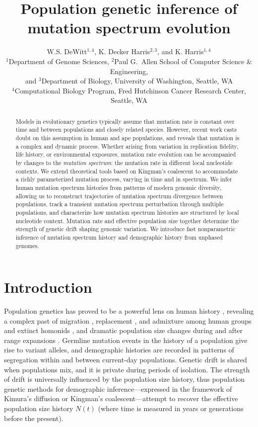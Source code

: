 \documentclass[11pt]{article}
\title{Population genetic inference of mutation spectrum evolution}
\author{
W.S. DeWitt$^{1,4}$, K. Decker Harris$^{2,3}$, and K. Harris$^{1,4}$\\
{\small
$^1$Department of Genome Sciences,
$^2$Paul G.\ Allen School of Computer Science \& Engineering,}\\
{\small and $^3$Department of Biology, University of Washington, Seattle, WA}\\
{\small $^4$Computational Biology Program, Fred Hutchinson Cancer Research Center, Seattle, WA}
}
\begin{document}
\maketitle

\begin{abstract}

Models in evolutionary genetics typically assume that mutation rate is constant over time and between populations and closely related species.
However, recent work casts doubt on this assumption in human and ape populations, and reveals that mutation is a complex and dynamic process.
Whether arising from variation in replication fidelity, life history, or environmental exposures, mutation rate evolution can be accompanied by changes to the \emph{mutation spectrum}: the mutation rate in different local nucleotide contexts.
We extend theoretical tools based on Kingman's coalescent to accommodate a richly parameterized mutation process, varying in time and in spectrum.
We infer human mutation spectrum histories from patterns of modern genomic diversity, allowing us to reconstruct trajectories of mutation spectrum divergence between populations, track a transient mutation spectrum perturbation through multiple populations, and characterize how mutation spectrum histories are structured by local nucleotide context.
Mutation rate and effective population size together determine the strength of genetic drift shaping genomic variation.
We introduce fast nonparametric inference of mutation spectrum history and demographic history from unphased genomes.

\end{abstract}


\section*{Introduction}\label{sec:intro}

Population genetics has proved to be a powerful lens on human history \cite{Harris2017-cd}, revealing a complex past of migration \cite{?}, replacement \cite{?}, and admixture among human groups and extinct homonids \cite{?}, and dramatic population size changes during and after range expansions \cite{?}.
Germline mutation events in the history of a population give rise to variant alleles, and demographic histories are recorded in patterns of segregation within and between current-day populations.
Genetic drift is shared when populations mix, and it is private during periods of isolation.
The strength of drift is universally influenced by the population size history, thus population genetic methods for demographic inference---expressed in the framework of Kimura's diffusion or Kingman's coalescent---attempt to recover the effective population size history $N(t)$ (where time is measured in years or generations before the present).
\end{document}
